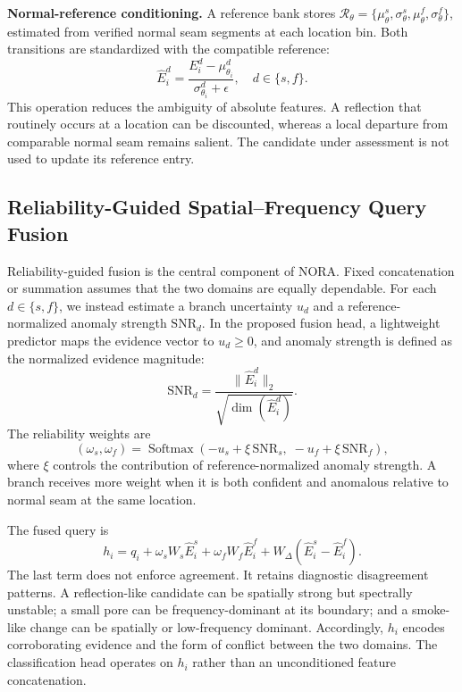 \textbf{Normal-reference conditioning.} A reference bank stores $\mathcal R_{\theta}=\{\mu_{\theta}^{s},\sigma_{\theta}^{s},\mu_{\theta}^{f},\sigma_{\theta}^{f}\}$, estimated from verified normal seam segments at each location bin. Both transitions are standardized with the compatible reference:
\begin{equation}
\widehat E_i^d=\frac{E_i^d-\mu_{\theta_i}^d}{\sigma_{\theta_i}^d+\epsilon},\quad d\in\{s,f\}.
\label{eq:reference-conditioning}
\end{equation}
This operation reduces the ambiguity of absolute features. A reflection that routinely occurs at a location can be discounted, whereas a local departure from comparable normal seam remains salient. The candidate under assessment is not used to update its reference entry.

\subsection{Reliability-Guided Spatial--Frequency Query Fusion}
\label{sec:reliability-fusion}

Reliability-guided fusion is the central component of NORA. Fixed concatenation or summation assumes that the two domains are equally dependable. For each $d\in\{s,f\}$, we instead estimate a branch uncertainty $u_d$ and a reference-normalized anomaly strength $\mathrm{SNR}_d$. In the proposed fusion head, a lightweight predictor maps the evidence vector to $u_d\geq0$, and anomaly strength is defined as the normalized evidence magnitude:
\begin{equation}
\mathrm{SNR}_d=\frac{\|\widehat E_i^d\|_2}{\sqrt{\dim(\widehat E_i^d)}}.
\end{equation}
The reliability weights are
\begin{equation}
(\omega_s,\omega_f)=\operatorname{Softmax}(-u_s+\xi\,\mathrm{SNR}_s,\;-u_f+\xi\,\mathrm{SNR}_f),
\label{eq:reliability}
\end{equation}
where $\xi$ controls the contribution of reference-normalized anomaly strength. A branch receives more weight when it is both confident and anomalous relative to normal seam at the same location.

The fused query is
\begin{equation}
h_i=q_i+\omega_sW_s\widehat E_i^s+\omega_fW_f\widehat E_i^f+W_\Delta(\widehat E_i^s-\widehat E_i^f).
\label{eq:fusion}
\end{equation}
The last term does not enforce agreement. It retains diagnostic disagreement patterns. A reflection-like candidate can be spatially strong but spectrally unstable; a small pore can be frequency-dominant at its boundary; and a smoke-like change can be spatially or low-frequency dominant. Accordingly, $h_i$ encodes corroborating evidence and the form of conflict between the two domains. The classification head operates on $h_i$ rather than an unconditioned feature concatenation.

